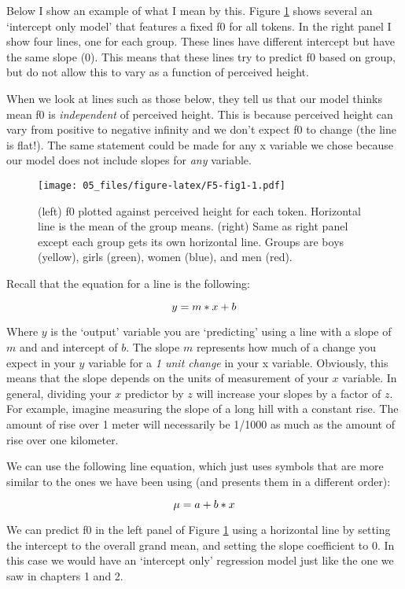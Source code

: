 \documentclass[
]{book}
\begin{document}
Below I show an example of what I mean by this. Figure \ref{fig:F5-fig1} shows several an `intercept only model' that features a fixed f0 for all tokens. In the right panel I show four lines, one for each group. These lines have different intercept but have the same slope (0). This means that these lines try to predict f0 based on group, but do not allow this to vary as a function of perceived height.

When we look at lines such as those below, they tell us that our model thinks mean f0 is \emph{independent} of perceived height. This is because perceived height can vary from positive to negative infinity and we don't expect f0 to change (the line is flat!). The same statement could be made for any x variable we chose because our model does not include slopes for \emph{any} variable.

\begin{figure}
\centering
\texttt{[image: 05\_files/figure-latex/F5-fig1-1.pdf]}
\caption{\label{fig:F5-fig1}(left) f0 plotted against perceived height for each token. Horizontal line is the mean of the group means. (right) Same as right panel except each group gets its own horizontal line. Groups are boys (yellow), girls (green), women (blue), and men (red).}
\end{figure}

Recall that the equation for a line is the following:

\[
y = m*x + b \\ 
\label{eq:51}
\]

Where \(y\) is the `output' variable you are `predicting' using a line with a slope of \(m\) and and intercept of \(b\). The slope \(m\) represents how much of a change you expect in your \(y\) variable for a \emph{1 unit change} in your x variable. Obviously, this means that the slope depends on the units of measurement of your \(x\) variable. In general, dividing your \(x\) predictor by \(z\) will increase your slopes by a factor of \(z\). For example, imagine measuring the slope of a long hill with a constant rise. The amount of rise over 1 meter will necessarily be 1/1000 as much as the amount of rise over one kilometer.

We can use the following line equation, which just uses symbols that are more similar to the ones we have been using (and presents them in a different order):

\[
\mu = a + b*x \\
\label{eq:52}
\]

We can predict f0 in the left panel of Figure \ref{fig:F5-fig1} using a horizontal line by setting the intercept to the overall grand mean, and setting the slope coefficient to 0. In this case we would have an `intercept only' regression model just like the one we saw in chapters 1 and 2.
\end{document}
